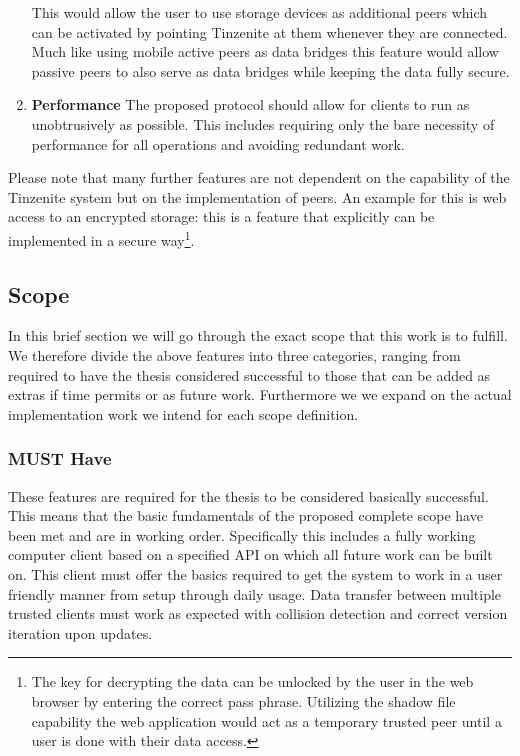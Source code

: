 \begin{enumerate}
    This would allow the user to use storage devices as additional peers which can be activated by pointing Tinzenite at them whenever they are connected.
    Much like using mobile active peers as data bridges this feature would allow passive peers to also serve as data bridges while keeping the data fully secure.
\item \textbf{Performance}
    The proposed protocol should allow for clients to run as unobtrusively as possible.
    This includes requiring only the bare necessity of performance for all operations and avoiding redundant work.
\end{enumerate}

Please note that many further features are not dependent on the capability of the Tinzenite system but on the implementation of peers.
An example for this is web access to an encrypted storage: this is a feature that explicitly can be implemented in a secure way\footnote{The key for decrypting the data can be unlocked by the user in the web browser by entering the correct pass phrase. Utilizing the shadow file capability the web application would act as a temporary trusted peer until a user is done with their data access.}.

\subsection{Scope}

In this brief section we will go through the exact scope that this work is to fulfill.
We therefore divide the above features into three categories, ranging from required to have the thesis considered successful to those that can be added as extras if time permits or as future work.
Furthermore we we expand on the actual implementation work we intend for each scope definition.

\subsubsection{MUST Have}
\label{subs:MUST Have}

These features are required for the thesis to be considered basically successful.
This means that the basic fundamentals of the proposed complete scope have been met and are in working order.
Specifically this includes a fully working computer client based on a specified API on which all future work can be built on.
This client must offer the basics required to get the system to work in a user friendly manner from setup through daily usage.
Data transfer between multiple trusted clients must work as expected with collision detection and correct version iteration upon updates.


